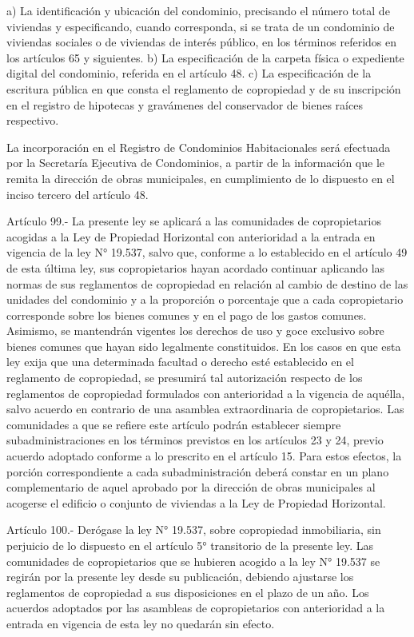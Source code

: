     a) La identificación y ubicación del condominio, precisando el número total de viviendas y especificando, cuando corresponda, si se trata de un condominio de viviendas sociales o de viviendas de interés público, en los términos referidos en los artículos 65 y siguientes.
    b) La especificación de la carpeta física o expediente digital del condominio, referida en el artículo 48.
    c) La especificación de la escritura pública en que consta el reglamento de copropiedad y de su inscripción en el registro de hipotecas y gravámenes del conservador de bienes raíces respectivo.
     
    La incorporación en el Registro de Condominios Habitacionales será efectuada por la Secretaría Ejecutiva de Condominios, a partir de la información que le remita la dirección de obras municipales, en cumplimiento de lo dispuesto en el inciso tercero del artículo 48.
     
    Artículo 99.- La presente ley se aplicará a las comunidades de copropietarios acogidas a la Ley de Propiedad Horizontal con anterioridad a la entrada en vigencia de la ley N° 19.537, salvo que, conforme a lo establecido en el artículo 49 de esta última ley, sus copropietarios hayan acordado continuar aplicando las normas de sus reglamentos de copropiedad en relación al cambio de destino de las unidades del condominio y a la proporción o porcentaje que a cada copropietario corresponde sobre los bienes comunes y en el pago de los gastos comunes. Asimismo, se mantendrán vigentes los derechos de uso y goce exclusivo sobre bienes comunes que hayan sido legalmente constituidos.
    En los casos en que esta ley exija que una determinada facultad o derecho esté establecido en el reglamento de copropiedad, se presumirá tal autorización respecto de los reglamentos de copropiedad formulados con anterioridad a la vigencia de aquélla, salvo acuerdo en contrario de una asamblea extraordinaria de copropietarios.
    Las comunidades a que se refiere este artículo podrán establecer siempre subadministraciones en los términos previstos en los artículos 23 y 24, previo acuerdo adoptado conforme a lo prescrito en el artículo 15. Para estos efectos, la porción correspondiente a cada subadministración deberá constar en un plano complementario de aquel aprobado por la dirección de obras municipales al acogerse el edificio o conjunto de viviendas a la Ley de Propiedad Horizontal.
   
    Artículo 100.- Derógase la ley N° 19.537, sobre copropiedad inmobiliaria, sin perjuicio de lo dispuesto en el artículo 5° transitorio de la presente ley.
    Las comunidades de copropietarios que se hubieren acogido a la ley N° 19.537 se regirán por la presente ley desde su publicación, debiendo ajustarse los reglamentos de copropiedad a sus disposiciones en el plazo de un año. Los acuerdos adoptados por las asambleas de copropietarios con anterioridad a la entrada en vigencia de esta ley no quedarán sin efecto.



